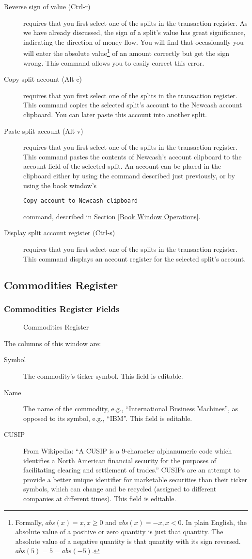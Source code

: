 \documentclass{report}
\newcommand{\graphicsfig}[5]{
\begin{figure}[#5]
\begin{center}
\resizebox{#1}{!}{\texttt{[image: \#2]}}
\end{center}
\caption{#3}
\label{#4}
\end{figure}
}
\begin{document}
\begin{description}
\item [Reverse sign of value (Ctrl-r)]  requires that you first select one of the splits in the transaction register. As we have already discussed, the sign of a split's value has great significance, indicating the direction of money flow. You will find that occasionally you will enter the absolute value\footnote{Formally, $abs(x)=x,  x \ge 0$ and $abs(x)=-x,  x < 0$. In plain English, the absolute value of a positive or zero quantity is just that quantity. The absolute value of a negative quantity is that quantity with its sign reversed. $abs(5)=5=abs(-5)$.} of an amount correctly but get the sign wrong. This command allows you to easily correct this error.
\item [Copy split account (Alt-c)]  requires that you first select one of the splits in the transaction register. This command copies the selected split's account to the Newcash account clipboard. You can later paste this account into another split.
\item [Paste split account (Alt-v)]  requires that you first select one of the splits in the transaction register. This command pastes the contents of Newcash's account clipboard to the account field of the selected split. An account can be placed in the clipboard either by using the command described just previously, or by using the book window's 
\begin{verbatim}
Copy account to Newcash clipboard
\end{verbatim}
 command, described in Section \ref{Book Window Operations}.
\item [Display split account register (Ctrl-s)]  requires that you first select one of the splits in the transaction register. This command displays an account register for the selected split's account.
\end{description}
\subsection{Commodities Register}
\subsubsection{Commodities Register Fields}
\graphicsfig{5in}{figures/commodities_register.png}{Commodities Register}{Commodities Register}{}
The columns of this window are:
\begin{description}
\item [Symbol]The commodity's ticker symbol. This field is editable. 
\item [Name]The name of the commodity, e.g., ``International Business Machines'', as opposed to its symbol, e.g., ``IBM''. This field is editable. 
\item [CUSIP]From Wikipedia: ``A CUSIP is a 9-character alphanumeric code which identifies a North American financial security for the purposes of facilitating clearing and settlement of trades.'' CUSIPs are an attempt to provide a better unique identifier for marketable securities than their ticker symbols, which can change and be recycled (assigned to different companies at different times). This field is editable. 
\end{description}
\end{document}
